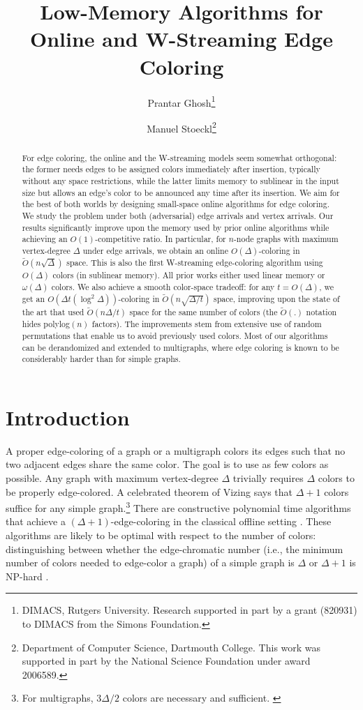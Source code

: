 \documentclass[10pt]{article}
\title{Low-Memory Algorithms for Online and W-Streaming Edge Coloring}
\author{Prantar Ghosh\thanks{DIMACS, Rutgers University. Research supported in part by a grant (820931) to DIMACS from the Simons Foundation.} \and 
Manuel Stoeckl\thanks{Department of Computer Science, Dartmouth College. This work was supported in part by the National Science Foundation under award 2006589.}}
\date{}
\theoremstyle{definition}\newtheorem{definition}[lemma]{Definition}
\theoremstyle{remark}  \newtheorem*{remark}{Remark}
\newcommand{\tO}{\widetilde{O}}
\begin{document}
\maketitle

\begin{abstract}
For edge coloring, the online and the W-streaming models
seem somewhat orthogonal: the former needs edges to be 
assigned colors immediately after insertion, typically 
without any space restrictions, while the latter limits 
memory to sublinear in the input size but allows an 
edge's color to be announced any time after its 
insertion. We aim for the best of both worlds by 
designing small-space online algorithms for edge 
coloring. We study the problem under both (adversarial) 
edge arrivals and vertex arrivals. Our results 
significantly improve upon the memory used by prior 
online algorithms while achieving an $O(1)$-competitive 
ratio. In particular, for $n$-node graphs with maximum 
vertex-degree $\Delta$ under edge arrivals, we obtain an 
online $O(\Delta)$-coloring in $\tilde{O}(n\sqrt{\Delta})$ space. 
This is also the first W-streaming edge-coloring algorithm using $O(\Delta)$ colors (in sublinear memory). All prior works either used linear memory or $\omega(\Delta)$ colors. We also achieve a smooth color-space tradeoff: for any $t=O(\Delta)$, we get an $O(\Delta t (\log^2 \Delta))$-coloring in $\tilde{O}(n\sqrt{\Delta/t})$ space, improving upon the state of the art that used $\tilde{O}(n\Delta/t)$ space for the same number of colors (the $\tO(.)$ notation hides polylog$(n)$ factors). The improvements stem from extensive use of random permutations that enable us to avoid previously used colors. Most of our algorithms can be derandomized and extended to multigraphs, where edge coloring is known to be considerably harder than for simple graphs.
\end{abstract}
\section{Introduction}

A proper edge-coloring of a graph or a multigraph colors its edges such that no two adjacent edges share the same color. The goal is to use as few colors as possible. Any graph with maximum vertex-degree $\Delta$ trivially requires $\Delta$ colors to be properly edge-colored. A celebrated theorem of Vizing \cite{Vizing64} says that $\Delta+1$ colors suffice for any simple graph.\footnote{For multigraphs, $3\Delta/2$ colors are necessary and sufficient. \cite{Shannon49}} There are constructive  polynomial time algorithms that achieve a $(\Delta+1)$-edge-coloring in the classical offline setting \cite{MisraG92}. These algorithms are likely to be optimal with respect to the number of colors: distinguishing between whether the edge-chromatic number (i.e., the minimum number of colors needed to edge-color a graph) of a simple graph is $\Delta$ or $\Delta+1$ is NP-hard \cite{Holyer81}.  
\end{document}
